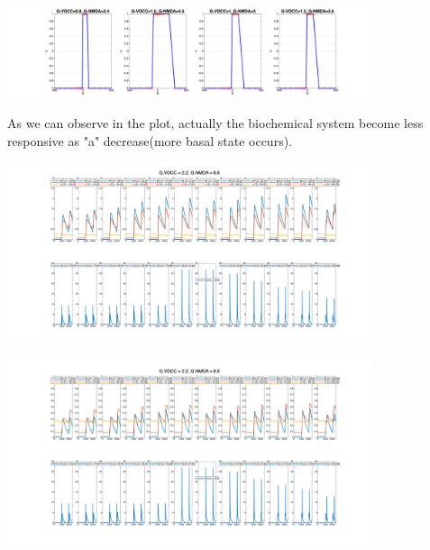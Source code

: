 \documentclass{article}
\begin{document}
\vspace{0.5cm} %

\begin{minipage}{\textwidth} %
    \centering
    \includegraphics[width=0.8\textwidth]{a=1.png} %
    \label{fig:a1}
\end{minipage}
As we can observe in the plot, actually the biochemical system become less responsive as "a" decrease(more basal state occurs).\\

\begin{minipage}{\textwidth} %
    \centering
    \includegraphics[width=0.8\textwidth]{a=0.1_G_VDCC=2.20_G_NMDA=6.60.png} %
    \label{fig:a0.1}
\end{minipage}

\vspace{0.5cm} %

\begin{minipage}{\textwidth} %
    \centering
    \includegraphics[width=0.8\textwidth]{a=0.25_G_VDCC=2.20_G_NMDA=6.60.png} %
    \label{fig:a0.25}
\end{minipage}
\end{document}
